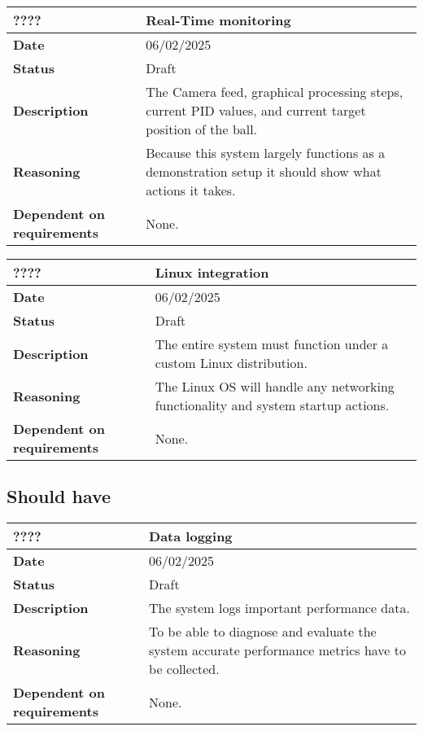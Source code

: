 \documentclass{article}
\begin{document}
\begin{table}[H]
    \renewcommand{\arraystretch}{1.3}
    \begin{tabular}{|l|p{10cm}|}
        \hline
        \rowcolor{gray!50}
        \textbf{????} & \textbf{Real-Time monitoring} \\ \hline
        \textbf{Date} & 06/02/2025 \\ \hline
        \textbf{Status} & Draft \\ \hline
        \textbf{Description} & The Camera feed, graphical processing steps, current PID values, and current target position of the ball. \\ \hline
        \textbf{Reasoning} & Because this system largely functions as a demonstration setup it should show what actions it takes. \\ \hline
        \textbf{Dependent on requirements} & None. \\ \hline
    \end{tabular}
\end{table}

\begin{table}[H]
    \renewcommand{\arraystretch}{1.3}
    \begin{tabular}{|l|p{10cm}|}
        \hline
        \rowcolor{gray!50}
        \textbf{????} & \textbf{Linux integration} \\ \hline
        \textbf{Date} & 06/02/2025 \\ \hline
        \textbf{Status} & Draft \\ \hline
        \textbf{Description} & The entire system must function under a custom Linux distribution. \\ \hline
        \textbf{Reasoning} & The Linux OS will handle any networking functionality and system startup actions. \\ \hline
        \textbf{Dependent on requirements} & None. \\ \hline
    \end{tabular}
\end{table}

\subsection{Should have}
\begin{table}[H]
    \renewcommand{\arraystretch}{1.3}
    \begin{tabular}{|l|p{10cm}|}
        \hline
        \rowcolor{gray!50}
        \textbf{????} & \textbf{Data logging} \\ \hline
        \textbf{Date} & 06/02/2025 \\ \hline
        \textbf{Status} & Draft \\ \hline
        \textbf{Description} & The system logs important performance data. \\ \hline
        \textbf{Reasoning} & To be able to diagnose and evaluate the system accurate performance metrics have to be collected. \\ \hline
        \textbf{Dependent on requirements} & None. \\ \hline
    \end{tabular}
\end{table}
\end{document}
